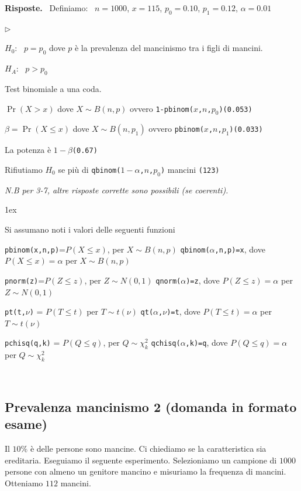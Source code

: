 \documentclass[12pt,openany]{book}
\newcommand{\mylabel}[1]{{\footnotesize\textsf{#1}}\hfill}
\renewenvironment{itemize}
  {\begin{list}{$\triangleright$}{%
   \setlength{\parskip}{0mm}
   \setlength{\topsep}{.2\baselineskip}
   \setlength{\rightmargin}{0mm}
   \setlength{\listparindent}{0mm}
   \setlength{\itemindent}{0mm}
   \setlength{\labelwidth}{3ex}
   \setlength{\itemsep}{.4\baselineskip}
   \setlength{\parsep}{0mm}
   \setlength{\partopsep}{0mm}
   \setlength{\labelsep}{1ex}
   \setlength{\leftmargin}{\labelwidth+\labelsep}
   \let\makelabel\mylabel}}{%
   \end{list}\vspace*{-1.3mm}}
\theoremstyle{mio}
\theoremstyle{liscio}
\begin{document}
\textbf{Risposte.} \ Definiamo: \ $n=1000$,\hfil
$x=115$,\hfil
$p_0=0.10$,\hfil
$p_1=0.12$,\hfil
$\alpha=0.01$\hfil

\begin{itemize}
\item[1.] $H_0$: \ $p=p_0$ dove $p$ è la prevalenza del mancinismo tra i figli di mancini.
\item[2.] $H_A$: \ $p>p_0$ 
\item[3.] Test binomiale a una coda.
\item[4.] $\Pr(X> x)$ dove $X\sim B(n,p)$ ovvero {\tt 1-pbinom($x$,$n$,$p_0$)}\hfill {\tt(0.053)}
\item[5.] $\beta=\Pr(X\le x)$ dove $X\sim B(n,p_1)$ ovvero {\tt pbinom($x$,$n$,$p_1$)}\hfill {\tt (0.033)}
\item[6.]  La potenza è $1-\beta$\hfill {\tt (0.67)}
\item[7.]  Rifiutiamo $H_0$ se più di {\tt qbinom($1-\alpha$,$n$,$p_0$)} mancini \hfill {\tt (123)}
\end{itemize}

\textit{N.B per 3-7, altre risposte corrette sono possibili (se coerenti).}

\parskip1ex
{\hrulefill\scriptsize

Si assumano noti i valori delle seguenti funzioni

{\tt pbinom(x,n,p)}=$P(X\le x)$, per $X\sim B(n,p)$
\hfill 
{\tt qbinom($\alpha$,n,p)=x},  dove $P(X\le x)=\alpha$ per $X\sim B(n,p)$

{\tt pnorm(z)}=$P(Z\le z)$, per $Z\sim N(0,1)$
\hfill 
{\tt qnorm($\alpha$)=z},  dove $P(Z\le z)=\alpha$ per $Z\sim N(0,1)$

{\tt pt(t,$\nu$)} = $P(T\le t)$ per $T\sim t(\nu)$
\hfill
{\tt qt($\alpha$,$\nu$)=t}, dove $P(T\le t)=\alpha$ per $T\sim t(\nu)$

{\tt pchisq(q,k)} = $P(Q\le q)$, per $Q\sim \chi^2_k$
\hfill
{\tt qchisq($\alpha$,k)=q},  dove $P(Q\le q)=\alpha$ per $Q\sim \chi^2_k$
\par
}

\hfill{}\clearpage\
\subsection{Prevalenza mancinismo 2 (domanda in formato esame)}

Il $10\%$ è delle persone sono mancine. Ci chiediamo se la caratteristica sia ereditaria. Eseguiamo il seguente esperimento. Selezioniamo un campione di $1000$ persone con almeno un genitore mancino e misuriamo la frequenza di mancini. Otteniamo $112$ mancini. 
\end{document}
